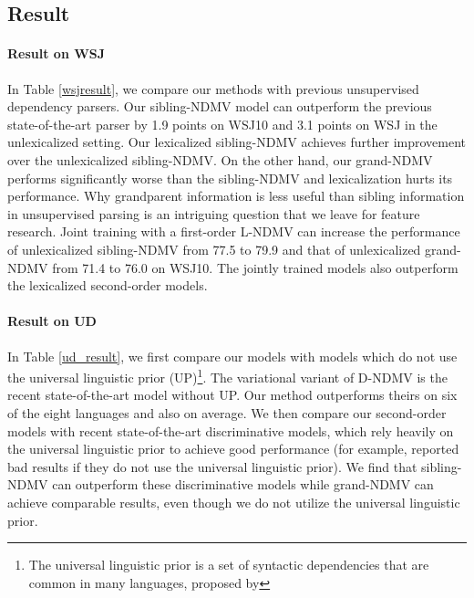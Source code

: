 \documentclass[11pt]{article}
\begin{document}
\subsection{Result}
\paragraph{Result on WSJ}In Table \ref{wsjresult}, we compare our methods with previous unsupervised dependency parsers. Our sibling-NDMV model can outperform the previous state-of-the-art parser by 1.9 points on WSJ10 and 3.1 points on WSJ in the unlexicalized setting.  Our lexicalized sibling-NDMV achieves further improvement over the unlexicalized sibling-NDMV. On the other hand, our grand-NDMV performs significantly worse than the sibling-NDMV and lexicalization hurts its performance. Why grandparent information is less useful than sibling information in unsupervised parsing is an intriguing question that we leave for feature research. 
Joint training with a first-order L-NDMV can increase the performance of unlexicalized sibling-NDMV from 77.5 to 79.9 and that of unlexicalized grand-NDMV from 71.4 to 76.0 on WSJ10. The jointly trained models also outperform the lexicalized second-order models.

\paragraph{Result on UD} In Table \ref{ud_result}, we first compare our models with models which do not use the universal linguistic prior (UP)\footnote{The universal linguistic prior is a set of syntactic dependencies that are common in many languages, proposed by }. The variational variant of D-NDMV \cite{Han2019EnhancingUG}
is the recent state-of-the-art model without UP. Our method outperforms theirs on six of the eight languages and also on average. We then compare our second-order models with recent state-of-the-art discriminative models, which rely heavily on the universal linguistic prior to achieve good performance (for example,  reported bad results if they do not use the universal linguistic prior). We find that sibling-NDMV can outperform these discriminative models while grand-NDMV can achieve comparable results, even though we do not utilize the universal linguistic prior.
\end{document}
